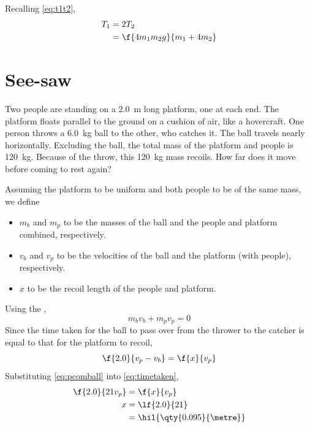 Recalling \cref{eq:t1t2},
\begin{align*}
	T_1 & = 2T_2                   \\
	    & = \f{4m_1m_2g}{m_1+4m_2}
\end{align*}

\section{See-saw}
\begin{problem}
Two people are standing on a \qty{2.0}{\metre} long platform, one at
each end. The platform floats parallel
to the ground on a cushion of air, like a hovercraft. One person
throws a \qty{6.0}{\kg} ball
to the other, who catches it. The ball travels nearly horizontally.
Excluding the ball, the total mass of the platform and people is
\qty{120}{\kg}. Because of the throw, this \qty{120}{\kg} mass
recoils. How far
does it move before coming to rest again?
\end{problem}

Assuming the platform to be uniform and both people to be of the same
mass, we define
\begin{itemize}
	\item \(m_b\) and \(m_p\) to be the masses of the ball and the
	      people and platform combined, respectively.
	\item \({v}_b\) and \({v}_p\) to be the velocities of the ball
	      and the platform (with people), respectively.
	\item \(x\) to be the recoil length of the people and platform.
\end{itemize}
Using the ,
\begin{equation}
	m_b{v}_b + m_p{v}_p = 0
	\label{eq:pcomball}
\end{equation}
Since the time taken for the ball to pass over from the thrower to the catcher
is equal to that for the platform to recoil,
\begin{equation}
	\f{2.0}{{v}_p - {v}_b} = \f{x}{{v}_p}
	\label{eq:timetaken}
\end{equation}
Substituting \cref{eq:pcomball} into \cref{eq:timetaken},
\begin{align*}
	\f{2.0}{21{v}_p} & = \f{x}{{v}_p}              \\
	x                & = \lf{2.0}{21}              \\
	                 & = \hil{\qty{0.095}{\metre}}
\end{align*}

